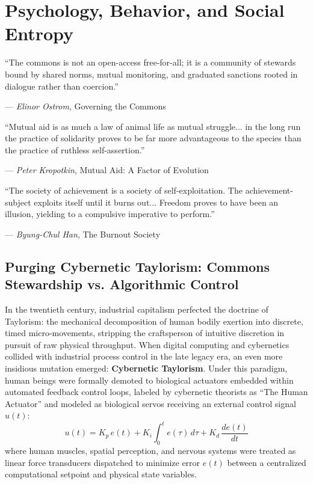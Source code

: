 \chapter{Psychology, Behavior, and Social Entropy}
\label{chap:psychology_behavior}

\epigraph{
    ``The commons is not an open-access free-for-all; it is a community of stewards bound by shared norms, mutual monitoring, and graduated sanctions rooted in dialogue rather than coercion.''
}{--- \textit{Elinor Ostrom}, \textnormal{Governing the Commons} \cite{ostrom1990}}

\epigraph{
    ``Mutual aid is as much a law of animal life as mutual struggle... in the long run the practice of solidarity proves to be far more advantageous to the species than the practice of ruthless self-assertion.''
}{--- \textit{Peter Kropotkin}, \textnormal{Mutual Aid: A Factor of Evolution} \cite{kropotkin1902}}

\epigraph{
    ``The society of achievement is a society of self-exploitation. The achievement-subject exploits itself until it burns out... Freedom proves to have been an illusion, yielding to a compulsive imperative to perform.''
}{--- \textit{Byung-Chul Han}, \textnormal{The Burnout Society} \cite{han2015}}

\section{Purging Cybernetic Taylorism: Commons Stewardship vs. Algorithmic Control}
\label{sec:purging_taylorism}

In the twentieth century, industrial capitalism perfected the doctrine of Taylorism: the mechanical decomposition of human bodily exertion into discrete, timed micro-movements, stripping the craftsperson of intuitive discretion in pursuit of raw physical throughput. When digital computing and cybernetics collided with industrial process control in the late legacy era, an even more insidious mutation emerged: \textbf{Cybernetic Taylorism}. Under this paradigm, human beings were formally demoted to biological actuators embedded within automated feedback control loops, labeled by cybernetic theorists as ``The Human Actuator'' and modeled as biological servos receiving an external control signal $u(t)$:
\begin{equation}
u(t) = K_p \, e(t) + K_i \int_0^t e(\tau) \, d\tau + K_d \, \frac{de(t)}{dt}
\label{eq:pid_human_fallacy}
\end{equation}
where human muscles, spatial perception, and nervous systems were treated as linear force transducers dispatched to minimize error $e(t)$ between a centralized computational setpoint and physical state variables.

